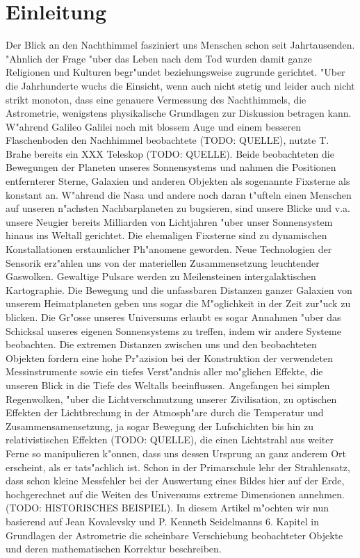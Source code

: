 \section{Einleitung}
Der Blick an den Nachthimmel fasziniert uns Menschen schon seit Jahrtausenden. "Ahnlich der Frage "uber das Leben nach dem Tod wurden damit ganze Religionen und Kulturen begr"undet beziehungsweise zugrunde gerichtet. 
"Uber die Jahrhunderte wuchs die Einsicht, wenn auch nicht stetig und leider auch nicht strikt monoton, dass eine genauere Vermessung des Nachthimmels, die Astrometrie, wenigstens physikalische Grundlagen zur Diskussion betragen kann. 
W"ahrend Galileo Galilei noch mit blossem Auge und einem besseren Flaschenboden den Nachhimmel beobachtete (TODO: QUELLE), nutzte T. Brahe bereits ein XXX Teleskop (TODO: QUELLE). 
Beide beobachteten die Bewegungen der Planeten unseres Sonnensystems und nahmen die Positionen entfernterer Sterne, Galaxien und anderen Objekten als sogenannte Fixsterne als konstant an. 
W"ahrend die Nasa und andere noch daran t"ufteln einen Menschen auf unseren n"achsten Nachbarplaneten zu bugsieren, sind unsere Blicke und v.a. unsere Neugier bereits Milliarden von Lichtjahren "uber unser Sonnensystem hinaus ins Weltall gerichtet. 
Die ehemaligen Fixsterne sind zu dynamischen Konstallationen erstaunlicher Ph"anomene geworden.
Neue Technologien der Sensorik erz"ahlen uns von der materiellen Zusammensetzung leuchtender Gaswolken. 
Gewaltige Pulsare werden zu Meilensteinen intergalaktischen Kartographie. 
Die Bewegung und die unfassbaren Distanzen ganzer Galaxien von unserem Heimatplaneten geben uns sogar die M"oglichkeit in der Zeit zur"uck zu blicken.
Die Gr"osse unseres Universums  erlaubt es sogar Annahmen "uber das Schicksal unseres eigenen Sonnensystems zu treffen, indem wir andere Systeme beobachten. 
Die extremen Distanzen zwischen uns und den beobachteten Objekten fordern eine hohe Pr"azision bei der Konstruktion der verwendeten Messinstrumente sowie ein tiefes Verst"andnis aller mo"glichen Effekte, die unseren Blick in die Tiefe des Weltalls beeinflussen. 
Angefangen bei simplen Regenwolken, "uber die Lichtverschmutzung unserer Zivilisation, zu optischen Effekten der Lichtbrechung in der Atmosph"are durch die Temperatur und Zusammensamensetzung, ja sogar Bewegung der Lufschichten bis hin zu relativistischen Effekten (TODO: QUELLE), die einen Lichtstrahl aus weiter Ferne so manipulieren k"onnen, dass uns dessen Ursprung an ganz anderem Ort erscheint, als er tats"achlich ist. 
Schon in der Primarschule lehr der Strahlensatz, dass schon kleine Messfehler bei der Auswertung eines Bildes hier auf der Erde, hochgerechnet auf die Weiten des Universums extreme Dimensionen annehmen. (TODO: HISTORISCHES BEISPIEL). 
In diesem Artikel m"ochten wir nun basierend auf Jean Kovalevsky und P. Kenneth Seidelmanns 6. Kapitel in Grundlagen der Astrometrie \cite{licht:astrometry} die scheinbare Verschiebung beobachteter Objekte und deren mathematischen Korrektur beschreiben. 

